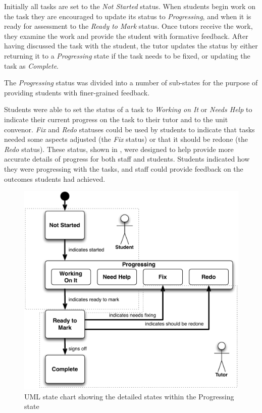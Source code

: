 Initially all tasks are set to the \emph{Not Started} status. When students begin work on the task they are encouraged to update its status to \emph{Progressing}, and when it is ready for assessment to the \emph{Ready to Mark} status. Once tutors receive the work, they examine the work and provide the student with formative feedback. After having discussed the task with the student, the tutor updates the status by either returning it to a \emph{Progressing} state if the task needs to be fixed, or updating the task as \emph{Complete}.

The \emph{Progressing} status was divided into a number of sub-states for the purpose of providing students with finer-grained feedback. 

Students were able to set the status of a task to \emph{Working on It} or \emph{Needs Help} to indicate their current progress on the task to their tutor and to the unit convenor. \emph{Fix} and \emph{Redo} statuses could be used by students to indicate that tasks needed some aspects adjusted (the \emph{Fix} status) or that it should be redone (the \emph{Redo} status). These status, shown in , were designed to help provide more accurate details of progress for both staff and students. Students indicated how they were progressing with the tasks, and staff could provide feedback on the outcomes students had achieved.

\begin{figure}[thbp]
  \centering
  \includegraphics[width=\textwidth]{DetailedStepsInProgress}
  \caption{UML state chart showing the detailed states within the Progressing state}
  \label{fig:detailed_states}
\end{figure}

